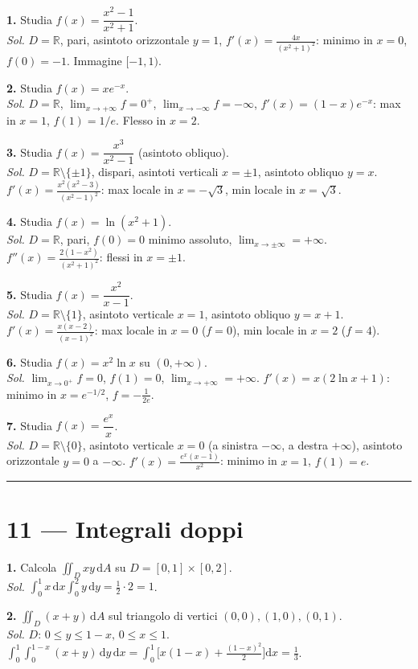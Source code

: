 \documentclass[11pt,a4paper]{article}
\newcommand{\R}{\mathbb{R}}
\newcommand{\dd}{\mathrm{d}}
\begin{document}
\textbf{1.} Studia $f(x)=\dfrac{x^2-1}{x^2+1}$.\\
\emph{Sol.} $D=\R$, pari, asintoto orizzontale $y=1$, $f'(x)=\tfrac{4x}{(x^2+1)^2}$: minimo in $x=0$, $f(0)=-1$. Immagine $[-1,1)$.

\textbf{2.} Studia $f(x)=xe^{-x}$.\\
\emph{Sol.} $D=\R$, $\lim_{x\to+\infty}f=0^+$, $\lim_{x\to-\infty}f=-\infty$, $f'(x)=(1-x)e^{-x}$: max in $x=1$, $f(1)=1/e$. Flesso in $x=2$.

\textbf{3.} Studia $f(x)=\dfrac{x^3}{x^2-1}$ (asintoto obliquo).\\
\emph{Sol.} $D=\R\setminus\{\pm 1\}$, dispari, asintoti verticali $x=\pm 1$, asintoto obliquo $y=x$. $f'(x)=\tfrac{x^2(x^2-3)}{(x^2-1)^2}$: max locale in $x=-\sqrt 3$, min locale in $x=\sqrt 3$.

\textbf{4.} Studia $f(x)=\ln(x^2+1)$.\\
\emph{Sol.} $D=\R$, pari, $f(0)=0$ minimo assoluto, $\lim_{x\to\pm\infty}=+\infty$. $f''(x)=\tfrac{2(1-x^2)}{(x^2+1)^2}$: flessi in $x=\pm 1$.

\textbf{5.} Studia $f(x)=\dfrac{x^2}{x-1}$.\\
\emph{Sol.} $D=\R\setminus\{1\}$, asintoto verticale $x=1$, asintoto obliquo $y=x+1$. $f'(x)=\tfrac{x(x-2)}{(x-1)^2}$: max locale in $x=0$ ($f=0$), min locale in $x=2$ ($f=4$).

\textbf{6.} Studia $f(x)=x^2\ln x$ su $(0,+\infty)$.\\
\emph{Sol.} $\lim_{x\to 0^+}f=0$, $f(1)=0$, $\lim_{x\to+\infty}=+\infty$. $f'(x)=x(2\ln x+1)$: minimo in $x=e^{-1/2}$, $f=-\tfrac{1}{2e}$.

\textbf{7.} Studia $f(x)=\dfrac{e^x}{x}$.\\
\emph{Sol.} $D=\R\setminus\{0\}$, asintoto verticale $x=0$ (a sinistra $-\infty$, a destra $+\infty$), asintoto orizzontale $y=0$ a $-\infty$. $f'(x)=\tfrac{e^x(x-1)}{x^2}$: minimo in $x=1$, $f(1)=e$.

\medskip\hrule\medskip

\section*{11 — Integrali doppi}

\textbf{1.} Calcola $\displaystyle\iint_D xy\,\dd A$ su $D=[0,1]\times[0,2]$.\\
\emph{Sol.} $\int_0^1 x\,\dd x \int_0^2 y\,\dd y = \tfrac{1}{2}\cdot 2 = 1$.

\textbf{2.} $\displaystyle\iint_D (x+y)\,\dd A$ sul triangolo di vertici $(0,0),(1,0),(0,1)$.\\
\emph{Sol.} $D:\,0\le y\le 1-x,\,0\le x\le 1$. $\int_0^1\!\int_0^{1-x}(x+y)\,\dd y\,\dd x=\int_0^1\Big[x(1-x)+\tfrac{(1-x)^2}{2}\Big]\dd x=\tfrac{1}{3}$.
\end{document}
